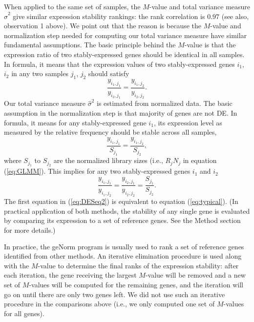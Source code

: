 \documentclass[11pt, a4paper]{article}
\begin{document}
When applied to the same set of samples, the $M$-value and total variance
measure $\hat\sigma^2$ give similar expression stability rankings: the rank
correlation is $0.97$ (see also, observation 1 above).
We point out that the reason is because the $M$-value and normalization step
needed for computing our total variance measure have similar fundamental
assumptions. 
The basic principle
behind the $M$-value is that the expression ratio of two stably-expressed
genes should be identical in all samples. In formula, it means that the
expression values of two stably-expressed genes $i_1$, $i_2$ in any two samples $j_1$, $j_2$
should satisfy
\begin{equation}\label{eq:typical}
   \dfrac{y_{i_1, j_1}}{y_{i_2, j_1}} = \dfrac{y_{i_1, j_2}}{y_{i_2, j_2}}.
\end{equation} 
Our total variance measure $\hat\sigma^2$ is estimated from normalized data.
The basic assumption in the normalization step is that majority of genes are
not DE. In formula, it means for any stably-expressed gene $i_1$, its expression
level as measured by the relative frequency should be stable across all
samples,
\begin{equation}\label{eq:DESeq} 
    \frac{y_{i_1, j_1}}{S_{j_1}}= \dfrac{y_{i_1, j_2}}{S_{j_2}},
\end{equation}
where $S_{j_1}$ to $S_{j_2}$ are the normalized library sizes (i.e., $R_j N_j$ in equation (\ref{eq:GLMM}).
This implies for any two stably-expressed genes $i_1$ and $i_2$
\begin{equation}\label{eq:DESeq2} 
    \frac{y_{i_1, j_1}}{y_{i_1, j_2}} = \frac{y_{i_2, j_1}}{y_{i_2, j_2}} =
    \frac{S_{j_1}}{S_{j_2}}.
\end{equation}
The first equation in (\ref{eq:DESeq2}) is equivalent to equation
(\ref{eq:typical}). (In practical application of both methods, the stability
of any single gene is evaluated by comparing its expression to a set of
reference genes. See the Method section for more details.)

In practice, the geNorm program \citep{vandesompele2002accurate} is usually
used to rank a set of reference genes identified from other methods.  An
iterative elimination procedure is used along with the $M$-value to determine
the final ranks of the expression stability:  after each iteration, the gene
receiving the largest $M$-value will be removed and a new set of $M$-values
will be computed for the remaining genes, and the iteration will go on until
there are only two genes left.  We did not use such an iterative procedure in
the comparisons above (i.e., we only computed one set of $M$-values for all
genes). 
\end{document}
